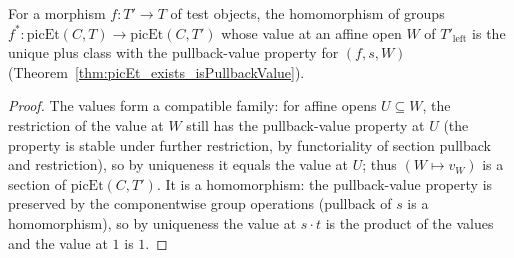 \begin{definition}
  \label{def:picEtMap}
  \leanok
  For a morphism \(f \colon T' \to T\) of test objects, the homomorphism of groups \(f^{*} \colon
  \mathrm{picEt}(C, T) \to \mathrm{picEt}(C, T')\) whose value at an affine open \(W\) of
  \(T'_{\mathrm{left}}\) is the unique plus class with the pullback-value property for \((f, s, W)\)
  (Theorem~\ref{thm:picEt_exists_isPullbackValue}).
\end{definition}
\begin{proof}
  \leanok
  The values form a compatible family: for affine opens \(U \subseteq W\), the restriction of the
  value at \(W\) still has the pullback-value property at \(U\) (the property is stable under
  further restriction, by functoriality of section pullback and restriction), so by uniqueness it
  equals the value at \(U\); thus \((W \mapsto v_W)\) is a section of \(\mathrm{picEt}(C, T')\). It
  is a homomorphism: the pullback-value property is preserved by the componentwise group operations
  (pullback of \(s\) is a homomorphism), so by uniqueness the value at \(s \cdot t\) is the product
  of the values and the value at \(1\) is \(1\).
\end{proof}

